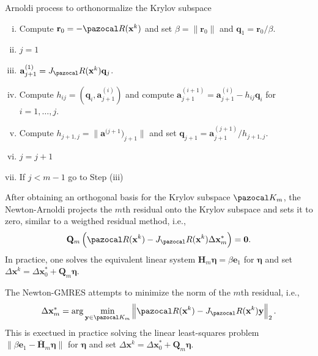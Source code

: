 \begin{framedbox}[htbp]
  \caption{Arnoldi process to orthonormalize the Krylov subspace}
  \label{box:arnoldi_process}
  \begin{center}
    \begin{minipage}{0.9\textwidth}
    \begin{enumerate}[(i)]
      \item Compute \(\mathbf r_0 = -\pazocal R(\mathbf x^k)\) and set \(\beta = \|\mathbf r_0\|\) and \(\mathbf q_1 = \mathbf r_0/\beta\).
      \item \(j=1\)
      \item \(\mathbf a^{(1)}_{j+1} = J_\pazocal R(\mathbf x^k) \mathbf q_j\).
      \item Compute \(h_{ij}=(\mathbf q_i, \mathbf a^{(i)}_{j+1})\) and compute \(\mathbf a^{(i+1)}_{j+1} = \mathbf a^{(i)}_{j+1} - h_{ij} \mathbf q_i\) for \(i=1,\dots,j\).
      \item Compute \(h_{j+1,j}=\|\mathbf a^{(j+1})_{j+1}\|\) and set \(\mathbf q_{j+1} = \mathbf a^{(j+1)}_{j+1}/h_{j+1,j}\).  
      \item \(j=j+1\)
      \item If \(j<m-1\) go to Step (iii)
    \end{enumerate}
    \end{minipage}
  \end{center}
\end{framedbox}

After obtaining an orthogonal basis for the Krylov subspace \(\pazocal K_m\), the Newton-Arnoldi projects the \(m\)th residual onto the Krylov subspace and sets it to zero, similar to a weigthed residual method, i.e.,
\begin{equation}
  \mathbf Q_m \left(\pazocal R(\mathbf x^k) - J_\pazocal R(\mathbf x^k)\Delta \mathbf x^*_m\right) = \mathbf 0.
\end{equation}
In practice, one solves the equivalent linear system \(\mathbf H_m \boldsymbol{\eta} = \beta \mathbf e_1\) for \(\boldsymbol{\eta}\) and set \(\Delta \mathbf x^k  =\Delta \mathbf x^*_0 + \mathbf Q_m\boldsymbol \eta\).

The Newton-GMRES attempts to minimize the norm of the \(m\)th residual, i.e.,
\begin{equation}
  \Delta \mathbf x^*_m = \arg\min_{\mathbf y\in \pazocal K_m} \left\|\pazocal R(\mathbf x^k) - J_\pazocal R(\mathbf x^k)\mathbf y\right\|_2.
\end{equation}
This is exectued in practice solving the linear least-squares problem \(\|\beta\mathbf e_1 -\bar{\mathbf H}_m \boldsymbol{\eta}\|\) for \(\boldsymbol{\eta}\) and set \(\Delta \mathbf x^k  =\Delta \mathbf x^*_0 + \mathbf Q_m\boldsymbol \eta\).

